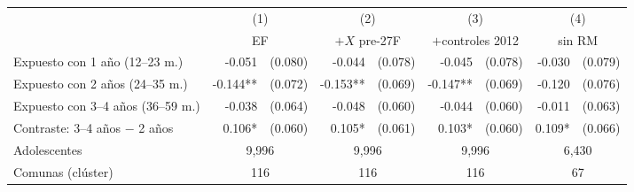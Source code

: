 \begin{tabular}{l rl rl rl rl}
\toprule
 & \multicolumn{2}{c}{(1)} & \multicolumn{2}{c}{(2)} & \multicolumn{2}{c}{(3)} & \multicolumn{2}{c}{(4)} \\
 & \multicolumn{2}{c}{EF} & \multicolumn{2}{c}{$+X$ pre-27F} & \multicolumn{2}{c}{$+$controles 2012} & \multicolumn{2}{c}{sin RM} \\
\midrule
Expuesto con 1 a\~no (12--23 m.) & -0.051 & (0.080) & -0.044 & (0.078) & -0.045 & (0.078) & -0.030 & (0.079) \\
Expuesto con 2 a\~nos (24--35 m.) & -0.144** & (0.072) & -0.153** & (0.069) & -0.147** & (0.069) & -0.120 & (0.076) \\
Expuesto con 3--4 a\~nos (36--59 m.) & -0.038 & (0.064) & -0.048 & (0.060) & -0.044 & (0.060) & -0.011 & (0.063) \\
\addlinespace
Contraste: 3--4 a\~nos $-$ 2 a\~nos & 0.106* & (0.060) & 0.105* & (0.061) & 0.103* & (0.060) & 0.109* & (0.066) \\
\midrule
Adolescentes & \multicolumn{2}{c}{9,996} & \multicolumn{2}{c}{9,996} & \multicolumn{2}{c}{9,996} & \multicolumn{2}{c}{6,430} \\
Comunas (cl\'uster) & \multicolumn{2}{c}{116} & \multicolumn{2}{c}{116} & \multicolumn{2}{c}{116} & \multicolumn{2}{c}{67} \\
\bottomrule
\end{tabular}
